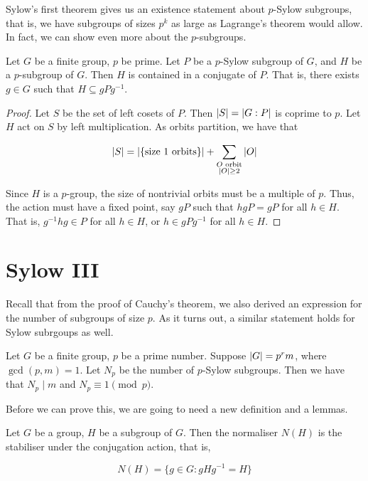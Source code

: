 \documentclass{article}
\begin{document}
    Sylow's first theorem gives us an existence statement about $p$-Sylow subgroups, that is, we have subgroups of sizes $p^k$ as large as Lagrange's theorem would allow. In fact, we can show even more about the $p$-subgroups.

    \begin{theorem*}
         Let $G$ be a finite group, $p$ be prime. Let $P$ be a $p$-Sylow subgroup of $G$, and $H$ be a $p$-subgroup of $G$. Then $H$ is contained in a conjugate of $P$. That is, there exists $g \in G$ such that $H \subseteq gPg^{-1}$.
    \end{theorem*}

    \begin{proof}
        Let $S$ be the set of left cosets of $P$. Then $\abs{S} = \abs{G : P}$ is coprime to $p$. Let $H$ act on $S$ by left multiplication. As orbits partition, we have that

        $$\abs{S} = \abs{\{\text{size }1\text{ orbits}\}} + \sum_{\substack{O \text{ orbit} \\ \abs{O} \ge 2}}\abs{O}$$

        Since $H$ is a $p$-group, the size of nontrivial orbits must be a multiple of $p$. Thus, the action must have a fixed point, say $gP$ such that $hgP = gP$ for all $h \in H$. That is, $g^{-1}hg \in P$ for all $h \in H$, or $h \in gPg^{-1}$ for all $h \in H$.
    \end{proof}

    \section{Sylow III}

    Recall that from the proof of Cauchy's theorem, we also derived an expression for the number of subgroups of size $p$. As it turns out, a similar statement holds for Sylow subrgoups as well.

    \begin{theorem*}
         Let $G$ be a finite group, $p$ be a prime number. Suppose $\abs{G} = p^r m$, where $\gcd(p, m) = 1$. Let $N_p$ be the number of $p$-Sylow subgroups. Then we have that $N_p \mid m$ and $N_p \equiv 1 \pmod p$.
    \end{theorem*}

    Before we can prove this, we are going to need a new definition and a lemmas.

    \begin{definition*}
        [Normaliser]

        Let $G$ be a group, $H$ be a subgroup of $G$. Then the normaliser $N(H)$ is the stabiliser under the conjugation action, that is,

        $$N(H) = \{g \in G : gHg^{-1} = H\}$$
    \end{definition*}
\end{document}
